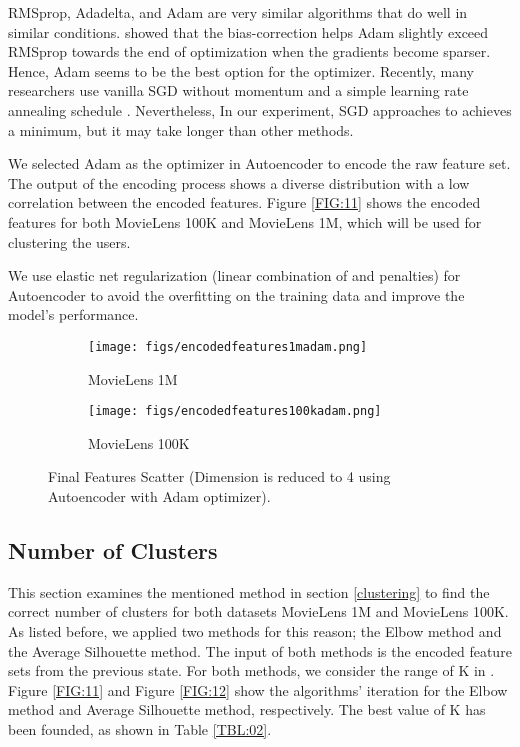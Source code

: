 \documentclass[a4paper,fleqn]{cas-dc}
\begin{document}
RMSprop, Adadelta, and Adam are very similar algorithms that do well in similar conditions. \citet{66kingma2014adam} showed that the bias-correction helps Adam slightly exceed RMSprop towards the end of optimization when the gradients become sparser. Hence, Adam seems to be the best option for the optimizer.  Recently, many researchers use vanilla SGD without momentum and a simple learning rate annealing schedule \citep{69ruder2016overview}. Nevertheless, In our experiment, SGD approaches to achieves a minimum, but it may take longer than other methods.

We selected Adam as the optimizer in Autoencoder to encode the raw feature set. The output of the encoding process shows a diverse distribution with a low correlation between the encoded features. Figure \ref{FIG:11} shows the encoded features for both MovieLens 100K and MovieLens 1M, which will be used for clustering the users.

We use elastic net regularization (linear combination of  and  penalties) \citep{87zou2005regularization} for Autoencoder to avoid the overfitting on the training data and improve the model's performance.


\begin{figure}
	\centering

	\begin{subfigure}{0.25\textwidth}
		\centering
		\texttt{[image: figs/encodedfeatures1madam.png]}
		\caption{MovieLens 1M}
		\label{fig10:sfig1}
	\end{subfigure}\begin{subfigure}{0.25\textwidth}
		\centering
		\texttt{[image: figs/encodedfeatures100kadam.png]}
		\caption{MovieLens 100K}
		\label{fig10:sfig2}
	\end{subfigure}

	\caption{Final Features Scatter (Dimension is reduced to 4 using Autoencoder with Adam optimizer).}
	\label{FIG:10}
\end{figure}


\subsection{Number of Clusters}
\label{test:clustering}
This section examines the mentioned method in section \ref{clustering} to find the correct number of clusters for both datasets MovieLens 1M and MovieLens 100K. As listed before, we applied two methods for this reason; the Elbow method and the Average Silhouette method. The input of both methods is the encoded feature sets from the previous state. For both methods, we consider the range of K in . Figure \ref{FIG:11} and Figure \ref{FIG:12} show the algorithms' iteration for the Elbow method and Average Silhouette method, respectively. The best value of K has been founded, as shown in Table \ref{TBL:02}.
\end{document}
